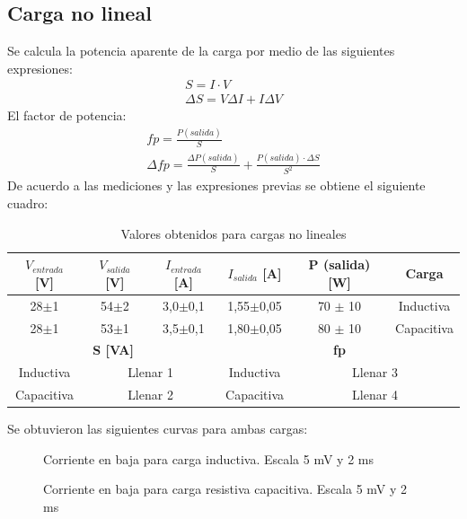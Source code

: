 \documentclass[11pt,letterpaper]{article}     %
\begin{document}
\subsection{Carga no lineal}
Se calcula la potencia aparente de la carga por medio de las siguientes expresiones:
\begin{align}
    S = I\cdot V\\
    \Delta S = V\Delta I + I\Delta V
\end{align}
El factor de potencia:
\begin{align}
    fp = \frac{P(salida)}{S} \\
    \Delta fp = \frac{\Delta P(salida) }{S} + \frac{P(salida)\cdot \Delta S}{S^{2}}
\end{align}
De acuerdo a las mediciones y las expresiones previas se obtiene el siguiente cuadro:
\begin{table}[H]
\centering
\caption{Valores obtenidos para cargas no lineales}
\label{ValoresCNL}
\begin{tabular}{|c|c|c|c|c|c|}
\hline
\textbf{$V_{entrada}$ {[}V{]}} & \textbf{$V_{salida}$ {[}V{]}} & \textbf{$I_{entrada}$ {[}A{]}} & \textbf{$I_{salida}$ {[}A{]}} & \textbf{P (salida) {[}W{]}} & \textbf{Carga} \\ \hline
28$\pm$1                       & 54$\pm$2                      & 3,0$\pm$0,1                    & 1,55$\pm$0,05                 & 70 $\pm$ 10                 & Inductiva      \\ \hline
28$\pm$1                       & 53$\pm$1                      & 3,5$\pm$0,1                    & 1,80$\pm$0,05                 & 80 $\pm$ 10                 & Capacitiva     \\ \hline
\multicolumn{3}{|c|}{\textbf{S {[}VA{]}}}                                                       & \multicolumn{3}{c|}{\textbf{fp}}                                             \\ \hline
Inductiva                      & \multicolumn{2}{c|}{Llenar 1}                                  & Inductiva                     & \multicolumn{2}{c|}{Llenar 3}                \\ \hline
Capacitiva                     & \multicolumn{2}{c|}{Llenar 2}                                  & Capacitiva                    & \multicolumn{2}{c|}{Llenar 4}                \\ \hline
\end{tabular}
\end{table}
Se obtuvieron las siguientes curvas para ambas cargas:
\begin{figure}[H]
    \centering
    \caption{Corriente en baja para carga inductiva. Escala 5 mV y 2 ms}
    \label{shuntInductiva}
\end{figure}
\begin{figure}[H]
    \centering
    \caption{Corriente en baja para carga resistiva capacitiva. Escala 5 mV y 2 ms}
    \label{shuntResisCapacitiva}
\end{figure}
\end{document}
